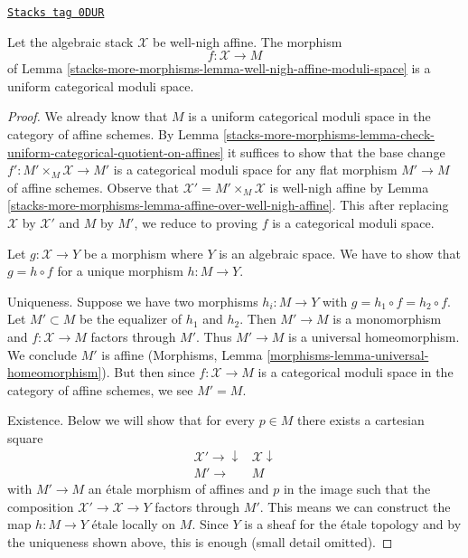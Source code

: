 \begin{lemma}
\label{stacks-more-morphisms-lemma-moduli-space-finite-affine}
\href{https://stacks.math.columbia.edu/tag/0DUR}{\texttt{Stacks tag 0DUR}}

Let the algebraic stack $\mathcal{X}$ be well-nigh affine. The morphism
$$
f : \mathcal{X} \longrightarrow M
$$
of Lemma \ref{stacks-more-morphisms-lemma-well-nigh-affine-moduli-space}
is a uniform categorical moduli space.
\end{lemma}

\begin{proof}
We already know that $M$ is a uniform categorical moduli space
in the category of affine schemes. By
Lemma \ref{stacks-more-morphisms-lemma-check-uniform-categorical-quotient-on-affines}
it suffices to show that the base change
$f' : M' \times_M \mathcal{X} \to M'$
is a categorical moduli space for any flat morphism
$M' \to M$ of affine schemes.
Observe that $\mathcal{X}' = M' \times_M \mathcal{X}$ is well-nigh affine by
Lemma \ref{stacks-more-morphisms-lemma-affine-over-well-nigh-affine}.
This after replacing $\mathcal{X}$ by $\mathcal{X}'$
and $M$ by $M'$, we reduce to proving $f$ is a categorical
moduli space.

\medskip\noindent
Let $g : \mathcal{X} \to Y$ be a morphism where $Y$ is an algebraic space.
We have to show that $g = h \circ f$ for a unique morphism $h : M \to Y$.

\medskip\noindent
Uniqueness. Suppose we have two morphisms $h_i : M \to Y$ with
$g = h_1 \circ f = h_2 \circ f$. Let $M' \subset M$ be the equalizer
of $h_1$ and $h_2$. Then $M' \to M$ is a monomorphism and
$f : \mathcal{X} \to M$ factors through $M'$. Thus $M' \to M$
is a universal homeomorphism. We conclude $M'$ is affine
(Morphisms, Lemma \ref{morphisms-lemma-universal-homeomorphism}).
But then since $f : \mathcal{X} \to M$
is a categorical moduli space in the category of affine schemes,
we see $M' = M$.

\medskip\noindent
Existence. Below we will show that for every $p \in M$ there exists
a cartesian square
$$
\begin{array}{cc}\mathcal{X}' \longrightarrow\downarrow & \mathcal{X} \downarrow \\ M' \longrightarrow & M\end{array}
$$
with $M' \to M$ an \'etale morphism of affines and $p$ in the image such that
the composition $\mathcal{X}' \to \mathcal{X} \to Y$ factors through $M'$.
This means we can construct the map $h : M \to Y$ \'etale locally on $M$.
Since $Y$ is a sheaf for the \'etale topology and by the uniqueness shown
above, this is enough (small detail omitted).


\end{proof}
